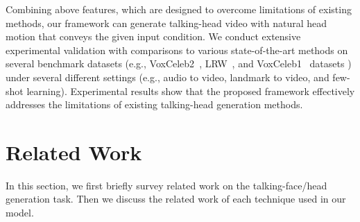 \documentclass[runningheads]{llncs}
\providecommand{\CXu}[1]{\textcolor{red}{[{\bf #1}]}}
\begin{document}
Combining above features, which are designed to overcome limitations of existing methods, our framework can generate talking-head video with natural head motion that conveys the given input condition. We conduct extensive experimental validation with comparisons to various state-of-the-art methods on several benchmark datasets (e.g., VoxCeleb2~\cite{Chung18b}, LRW~\cite{Chung16}, and VoxCeleb1~\cite{Nagrani17} datasets ) under several different settings (e.g., audio to video, landmark to video, and few-shot learning). Experimental results show that the proposed framework effectively addresses the limitations of existing talking-head generation methods.

\section{Related Work}
\label{sec:related}
In this section, we first briefly survey related work on the talking-face/head generation task. Then we discuss the related work of each technique used in our model. %

\end{document}
